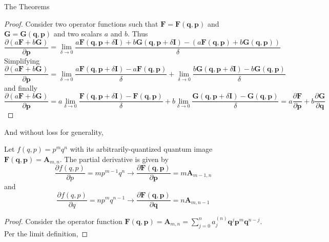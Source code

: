 \documentclass[aspectratio=169]{beamer}
\begin{document}
\begin{frame}[allowframebreaks]{The Theorems}
		\begin{proof}
			Consider two operator functions such that $\textbf{F}=\textbf{F}(\textbf{q},\textbf{p})$ and $\textbf{G}=\textbf{G}(\textbf{q},\textbf{p})$ and two scalars $a$ and $b$. Thus
			\begin{equation}
				\frac{\partial(a\textbf{F}+b\textbf{G})}{\partial \textbf{p}}=\lim_{\delta\to0}\frac{a\textbf{F}(\textbf{q},\textbf{p}+\delta\textbf{I})+b\textbf{G}(\textbf{q},\textbf{p}+\delta\textbf{I})-(a\textbf{F}(\textbf{q},\textbf{p})+b\textbf{G}(\textbf{q},\textbf{p}))}{\delta}
			\end{equation}
			Simplifying
			\begin{equation}
				\frac{\partial(a\textbf{F}+b\textbf{G})}{\partial \textbf{p}}=\lim_{\delta\to0}\frac{a\textbf{F}(\textbf{q},\textbf{p}+\delta\textbf{I})-a\textbf{F}(\textbf{q},\textbf{p})}{\delta}+\lim_{\delta\to0}\frac{b\textbf{G}(\textbf{q},\textbf{p}+\delta\textbf{I})-b\textbf{G}(\textbf{q},\textbf{p})}{\delta}
			\end{equation}
			and finally
			\begin{equation}
				\frac{\partial(a\textbf{F}+b\textbf{G})}{\partial \textbf{p}}=a\lim_{\delta\to0}\frac{\textbf{F}(\textbf{q},\textbf{p}+\delta\textbf{I})-\textbf{F}(\textbf{q},\textbf{p})}{\delta}+b\lim_{\delta\to0}\frac{\textbf{G}(\textbf{q},\textbf{p}+\delta\textbf{I})-\textbf{G}(\textbf{q},\textbf{p})}{\delta}=a\frac{\partial\textbf{F}}{\partial\textbf{p}}+b\frac{\partial\textbf{G}}{\partial\textbf{q}}
			\end{equation}
		\end{proof}
		And without loss for generality,
		\begin{theorem}\label{thm: dqost}
			Let $f(q,p)=p^mq^n$ with its arbitrarily-quantized quantum image $\textbf{F}(\textbf{q},\textbf{p})=\textbf{A}_{m,n}$. The partial derivative is given by
			\begin{equation}
				\frac{\partial f(q,p)}{\partial p}=mp^{m-1}q^n\longrightarrow\frac{\partial\textbf{F}(\textbf{q},\textbf{p})}{\partial\textbf{p}}=m\textbf{A}_{m-1,n}
			\end{equation}
			and
			\begin{equation}
				\frac{\partial f(q,p)}{\partial q}=np^{m}q^{n-1}\longrightarrow\frac{\partial\textbf{F}(\textbf{q},\textbf{p})}{\partial\textbf{q}}=n\textbf{A}_{m,n-1}
			\end{equation}
		\end{theorem}
		\begin{proof}
			Consider the operator function $\textbf{F}(\textbf{q},\textbf{p})=\textbf{A}_{m,n}=\displaystyle\sum_{j=0}^n a_j^{(n)}\textbf{q}^j\textbf{p}^m\textbf{q}^{n-j}$. Per the limit definition,

\end{proof}
\end{frame}
\end{document}
